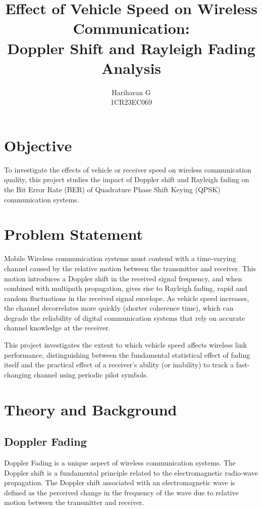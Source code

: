\documentclass[12pt]{article}
\title{Effect of Vehicle Speed on Wireless Communication: \\
Doppler Shift and Rayleigh Fading Analysis}
\author{Hariharan G \\ 1CR23EC069}
\date{}
\begin{document}
\maketitle

\section{Objective}
To investigate the effects of vehicle or receiver speed on wireless communication quality,
this project studies the impact of Doppler shift and Rayleigh fading on the Bit Error Rate (BER)
of Quadrature Phase Shift Keying (QPSK) communication systems.

\section{Problem Statement}

Mobile Wireless communication systems must contend with a time-varying channel caused by 
the relative motion between the transmitter and receiver. This motion introduces a Doppler 
shift in the received signal frequency, and when combined with multipath propagation, gives 
rise to Rayleigh fading, rapid and random fluctuations in the received signal envelope. 
As vehicle speed increases, the channel decorrelates more quickly (shorter
coherence time), which can degrade the reliability of digital communication systems 
that rely on accurate channel knowledge at the receiver.

This project investigates the extent to which vehicle speed affects wireless link 
performance, distinguishing between the fundamental statistical effect of fading 
itself and the practical effect of a receiver's ability (or inability) to track
a fast-changing channel using periodic pilot symbols.

\section{Theory and Background}
\subsection{Doppler Fading}
Doppler Fading is a unique aspect of wireless communication systems. The Doppler shift is a 
fundamental principle related to the electromagnetic radio-wave propagation. The Doppler shift 
associated with an electromagnetic wave is deﬁned as the perceived change in the frequency of 
the wave due to relative motion between the transmitter and receiver. 
\end{document}
